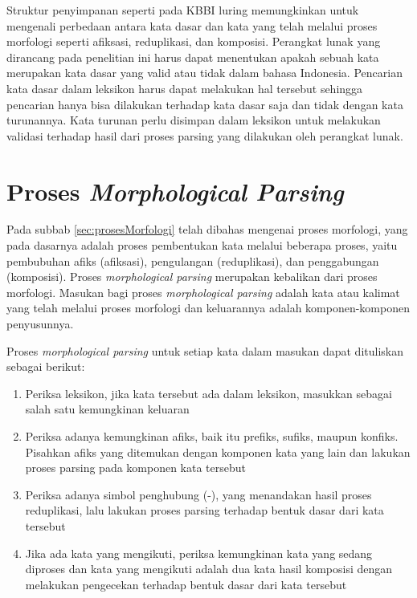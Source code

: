 Struktur penyimpanan seperti pada KBBI luring memungkinkan untuk mengenali perbedaan antara kata dasar dan kata yang telah melalui proses morfologi seperti afiksasi, reduplikasi, dan komposisi. Perangkat lunak yang dirancang pada penelitian ini harus dapat menentukan apakah sebuah kata merupakan kata dasar yang valid atau tidak dalam bahasa Indonesia. Pencarian kata dasar dalam leksikon harus dapat melakukan hal tersebut sehingga pencarian hanya bisa dilakukan terhadap kata dasar saja dan tidak dengan kata turunannya. Kata turunan perlu disimpan dalam leksikon untuk melakukan validasi terhadap hasil dari proses parsing yang dilakukan oleh perangkat lunak. %


\section{Proses \textit{Morphological Parsing}}
\label{sec:morphologicalParsing}

Pada subbab \ref{sec:prosesMorfologi} telah dibahas mengenai proses morfologi, yang pada dasarnya adalah proses pembentukan kata melalui beberapa proses, yaitu pembubuhan afiks (afiksasi), pengulangan (reduplikasi), dan penggabungan (komposisi). Proses \textit{morphological parsing} merupakan kebalikan dari proses morfologi. Masukan bagi proses \textit{morphological parsing} adalah kata atau kalimat yang telah melalui proses morfologi dan keluarannya adalah komponen-komponen penyusunnya.

Proses \textit{morphological parsing} untuk setiap kata dalam masukan dapat dituliskan sebagai berikut:
\begin{enumerate}
	\item Periksa leksikon, jika kata tersebut ada dalam leksikon, masukkan sebagai salah satu kemungkinan keluaran
	\item Periksa adanya kemungkinan afiks, baik itu prefiks, sufiks, maupun konfiks. Pisahkan afiks yang ditemukan dengan komponen kata yang lain dan lakukan proses parsing pada komponen kata tersebut
	\item Periksa adanya simbol penghubung (-), yang menandakan hasil proses reduplikasi, lalu lakukan proses parsing terhadap bentuk dasar dari kata tersebut
	\item Jika ada kata yang mengikuti, periksa kemungkinan kata yang sedang diproses dan kata yang mengikuti adalah dua kata hasil komposisi dengan melakukan pengecekan terhadap bentuk dasar dari kata tersebut
\end{enumerate}

